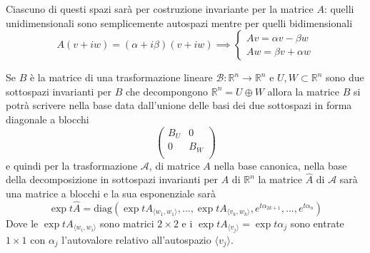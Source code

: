 \documentclass[11pt,a4paper,twoside]{book}
\theoremstyle{esss}
\theoremstyle{dotless}
\numberwithin{equation}{section} %
\begin{document}
Ciascuno di questi spazi sarà per costruzione invariante per la matrice $A$: quelli unidimensionali sono semplicemente autospazi mentre per quelli bidimensionali
\[
A(v+iw)=(\alpha+i\beta)(v+iw)\implies \begin{cases}Av=\alpha v-\beta w \\ Aw=\beta v+\alpha w \end{cases}
\]


Se $B$ è la matrice di una trasformazione lineare $\mathcal{B}:\mathbb{R}^n\rightarrow\mathbb{R}^n$ e $U,W\subset\mathbb{R}^n$ sono due sottospazi invarianti per $B$ che decompongono $\mathbb{R}^n=U\oplus W$ allora la matrice $B$ si potrà scrivere nella base data dall'unione delle basi dei due sottospazi in forma diagonale a blocchi
\begin{equation}\label{matrice blocchi sottospazi invarianti}
\left(
\begin{array}{cc}
B_U & 0 \\
0 & B_W \\
\end{array}
\right)
\end{equation}
e quindi per la trasformazione $\mathcal{A}$, di matrice $A$ nella base canonica, nella base della decomposizione in sottospazi invarianti per $A$ di $\mathbb{R}^n$ la matrice $\hat{A}$ di $\mathcal{A}$ sarà una matrice a blocchi e la sua esponenziale sarà
\[
\exp{t\hat{A}}=\text{diag} \left( \exp{tA}_{\langle w_1,w_1 \rangle},...,\exp{tA}_{\langle v_k,w_k \rangle },e^{t\alpha_{2k+1}},...,e^{t\alpha_{n}}  \right) 
\]
Dove le $\exp{tA}_{\langle w_i,w_i \rangle}$ sono matrici $2\times 2$ e i $\exp{tA_{\langle v_{j} \rangle}}=\exp{t\alpha_{j}}$ sono entrate $1\times 1$ con $\alpha_j$ l'autovalore relativo all'autospazio $\langle v_j \rangle$.
\end{document}
